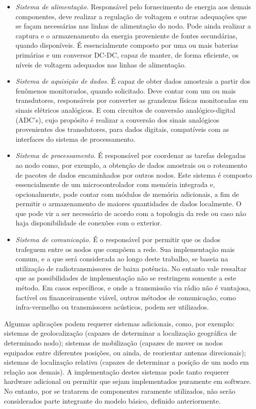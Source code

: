 \documentclass[
	12pt,				%
	openright,			%
	oneside,
	a4paper,			%
	english,			%
	french,				%
	spanish,			%
	brazil				%
	]{abntex2}
\begin{document}
\begin{itemize}
	\item \textit{Sistema de alimentação.} Responsável pelo fornecimento de energia aos demais componentes, deve realizar a regulação de voltagem e outras adequações que se façam necessárias nas linhas de alimentação do nodo. Pode ainda realizar a captura e o armazenamento da energia proveniente de fontes secundárias, quando disponíveis. É essencialmente composto por uma ou mais baterias primárias e um conversor DC-DC, capaz de manter, de forma eficiente, os níveis de voltagem adequados nas linhas de alimentação.
	\item \textit{Sistema de aquisição de dados.} É capaz de obter dados amostrais a partir dos fenômenos monitorados, quando solicitado. Deve contar com um ou mais transdutores, responsáveis por converter as grandezas físicas monitoradas em sinais elétricos analógicos. E com circuitos de conversão analógico-digital (ADC's), cujo propósito é realizar a conversão dos sinais analógicos provenientes dos transdutores, para dados digitais, compatíveis com as interfaces do sistema de processamento.
	\item \textit{Sistema de processamento.} É responsável por coordenar as tarefas delegadas ao nodo como, por exemplo, a obtenção de dados amostrais ou o roteamento de pacotes de dados encaminhados por outros nodos. Este sistema é composto essencialmente de um microcontrolador com memória integrada e, opcionalmente, pode contar com módulos de memória adicionais, a fim de permitir o armazenamento de maiores quantidades de dados localmente. O que pode vir a ser necessário de acordo com a topologia da rede ou caso não haja disponibilidade de conexões com o exterior.
	\item \textit{Sistema de comunicação.} É o responsável por permitir que os dados trafeguem entre os nodos que compõem a rede. Sua implementação mais comum, e a que será considerada ao longo deste trabalho, se baseia na utilização de radiotransmissores de baixa potência. No entanto vale ressaltar que as possibilidades de implementação não se restringem somente a este método. Em casos específicos, e onde a transmissão via rádio não é vantajosa, factível ou financeiramente viável, outros métodos de comunicação, como infra-vermelho ou transmissores acústicos, podem ser utilizados.
\end{itemize}

Algumas aplicações podem requerer sistemas adicionais, como, por exemplo: sistemas de geolocalização (capazes de determinar a localização geográfica de determinado nodo); sistemas de mobilização (capazes de mover os nodos equipados entre diferentes posições, ou ainda, de reorientar antenas direcionais); sistemas de localização relativa (capazes de determinar a posição de um nodo em relação aos demais). A implementação destes sistemas pode tanto requerer hardware adicional ou permitir que sejam implementados puramente em software. No entanto, por se tratarem de componentes raramente utilizados, não serão considerados parte integrante do modelo básico, definido anteriormente.
\end{document}

